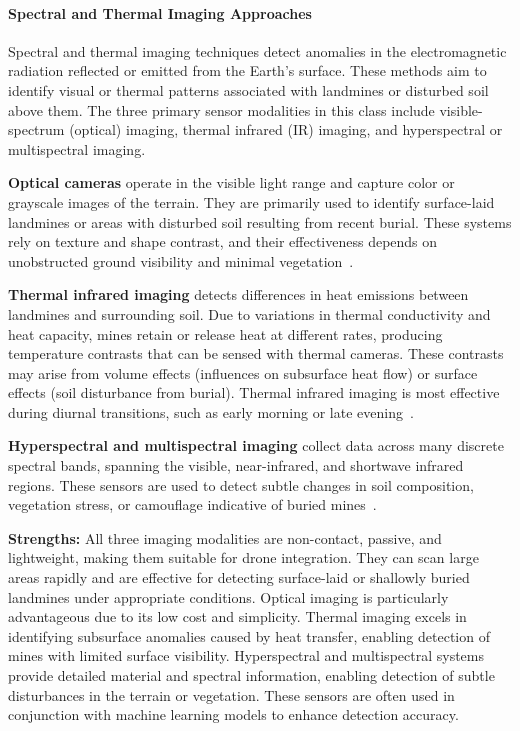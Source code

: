 \paragraph{Spectral and Thermal Imaging Approaches}

Spectral and thermal imaging techniques detect anomalies in the electromagnetic radiation reflected or emitted from the Earth's surface. These methods aim to identify visual or thermal patterns associated with landmines or disturbed soil above them. The three primary sensor modalities in this class include visible-spectrum (optical) imaging, thermal infrared (IR) imaging, and hyperspectral or multispectral imaging.

\textbf{Optical cameras} operate in the visible light range and capture color or grayscale images of the terrain. They are primarily used to identify surface-laid landmines or areas with disturbed soil resulting from recent burial. These systems rely on texture and shape contrast, and their effectiveness depends on unobstructed ground visibility and minimal vegetation~\cite{cardonalandmine}.

\textbf{Thermal infrared imaging} detects differences in heat emissions between landmines and surrounding soil. Due to variations in thermal conductivity and heat capacity, mines retain or release heat at different rates, producing temperature contrasts that can be sensed with thermal cameras. These contrasts may arise from volume effects (influences on subsurface heat flow) or surface effects (soil disturbance from burial). Thermal infrared imaging is most effective during diurnal transitions, such as early morning or late evening~\cite{Bruschini1997ASO,paik2002image,hutsul2024review}.

\textbf{Hyperspectral and multispectral imaging} collect data across many discrete spectral bands, spanning the visible, near-infrared, and shortwave infrared regions. These sensors are used to detect subtle changes in soil composition, vegetation stress, or camouflage indicative of buried mines~\cite{robledo2009survey,alqudsi2021review}.

\textbf{Strengths:} All three imaging modalities are non-contact, passive, and lightweight, making them suitable for drone integration. They can scan large areas rapidly and are effective for detecting surface-laid or shallowly buried landmines under appropriate conditions. Optical imaging is particularly advantageous due to its low cost and simplicity. Thermal imaging excels in identifying subsurface anomalies caused by heat transfer, enabling detection of mines with limited surface visibility. Hyperspectral and multispectral systems provide detailed material and spectral information, enabling detection of subtle disturbances in the terrain or vegetation. These sensors are often used in conjunction with machine learning models to enhance detection accuracy.

